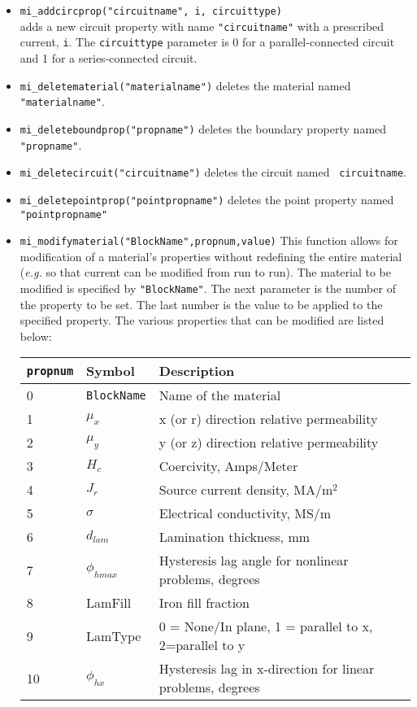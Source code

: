 \begin{itemize}
\item{\tt mi\_addcircprop("circuitname", i, circuittype)} \\
adds a new circuit property with name {\tt "circuitname"} with a prescribed current, {\tt i}.
The {\tt circuittype} parameter is 0 for a parallel-connected circuit and 1 for a
series-connected circuit.
\item{\tt mi\_deletematerial("materialname")} deletes the material named {\tt
"materialname"}.
\item{\tt mi\_deleteboundprop("propname")} deletes the boundary property named
{\tt "propname"}.
\item{\tt mi\_deletecircuit("circuitname")} deletes the circuit named {\tt
circuitname}.
\item{\tt mi\_deletepointprop("pointpropname")} deletes the point property named
{\tt "pointpropname"}
\item{\verb+mi_modifymaterial("BlockName",propnum,value)+} This
function allows for modification of a material's properties without
redefining the entire material ({\em e.g.} so that current can be
modified from run to run).  The material to be modified is
specified by {\tt "BlockName"}.  The next parameter is the number
of the property to be set. The last number is the value to be
applied to the specified property.  The various properties that can
be modified are listed below:
\begin{center}
\begin{tabular}{lll} \hline
{\tt propnum}& Symbol & Description \\ \hline
 0 & {\tt BlockName} & Name of the material \\
 1 & $\mu_x$ & x (or r) direction relative permeability \\
 2 & $\mu_y$ & y (or z) direction relative permeability \\
 3 & $H_c$   & Coercivity, Amps/Meter \\
 4 & $J_r$   & Source current density, MA/m$^2$ \\
 5 & $\sigma$ & Electrical conductivity, MS/m \\
 6 & $d_{lam}$  & Lamination thickness, mm \\
 7 & $\phi_{hmax}$ & Hysteresis lag angle for nonlinear problems, degrees \\
 8 & LamFill & Iron fill fraction \\
 9 & LamType & 0 = None/In plane, 1 = parallel to x, 2=parallel to y \\
 10 & $\phi_{hx}$ & Hysteresis lag in x-direction for linear problems, degrees \\

\end{tabular}
\end{center}
\end{itemize}
